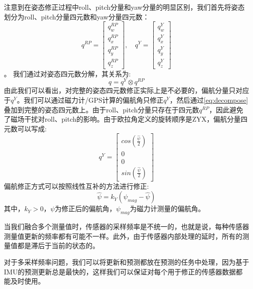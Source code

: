 \documentclass[
  type=master
]{gdutthesis}
\begin{document}
注意到在姿态修正过程中roll、pitch分量和yaw分量的明显区别，我们首先将姿态划分为roll、pitch分量四元数和yaw分量四元数：
\[
q^{RP} = 
\begin{bmatrix}
	q_w^{RP} \\
	q_x^{RP} \\
	q_y^{RP} \\
	q_z^{RP}
\end{bmatrix},
\hspace{1em}
q^{Y} = 
\begin{bmatrix}
	q_w^{Y} \\
	q_x^{Y} \\
	q_y^{Y} \\
	q_z^{Y}
\end{bmatrix}
\]。
我们通过对姿态四元数分解，其关系为:
\begin{equation}\label{eq:decompose}
	q = q^{Y} \otimes q^{RP}	
\end{equation}
由此我们可以看出，对完整的姿态四元数修正实际上是不必要的，偏航分量只对应于$q^{Y}$。我们可以通过磁力计/GPS计算的偏航角只修正$q^{Y}$，然后通过\autoref{eq:decompose}叠加到完整的姿态四元数上。由于roll、pitch分量只存在于四元数$q^{RP}$，因此避免了磁场干扰对roll、pitch的影响。由于欧拉角定义的旋转顺序是ZYX，偏航分量四元数可以写成:
\begin{equation}
	q^{Y} = 
	\begin{bmatrix}
		cos(\frac{\hat{\psi}}{2}) \\
		0 \\
		0 \\
		sin(\frac{\hat{\psi}}{2})
	\end{bmatrix}	
\end{equation}
偏航修正方式可以按照线性互补的方法进行修正:
\begin{equation}
	\hat{\psi} = k_Y (\psi_{mag} - \hat{\psi}) 	
\end{equation}
其中，$k_Y > 0$，$\hat{\psi}$为修正后的偏航角，$\psi_{mag}$为磁力计测量的偏航角。

当我们融合多个测量值时，传感器的采样频率是不统一的，也就是说，每种传感器测量值更新的频率都有可能不一样。此外，由于传感器内部处理的延时，所有的测量值都是滞后于当前的状态的。

对于多采样频率问题，我们可以将更新和预测都放在预测的任务中处理，因为基于IMU的预测更新总是最快的，这样我们可以保证对每个用于修正的传感器数据都能及时使用。
\end{document}
